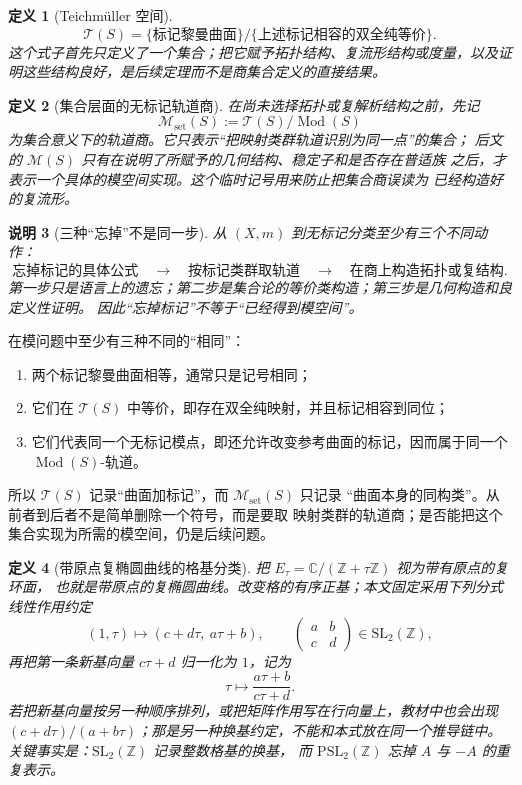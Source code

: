\documentclass[UTF8,fontset=none,a4paper,11pt]{ctexart}
\theoremstyle{foundation-definition}
\newtheorem{definition}{定义}[section]
\theoremstyle{foundation-theorem}
\theoremstyle{foundation-proposition}
\theoremstyle{foundation-example}
\theoremstyle{foundation-remark}
\newtheorem{remark}[definition]{说明}
\theoremstyle{foundation-theorem}
\newcommand{\T}{\mathcal T}
\newcommand{\M}{\mathcal M}
\newcommand{\Mod}{\operatorname{Mod}}
\begin{document}
\begin{definition}[Teichmüller 空间]\label{def:teich}
\[
\T(S)=
\{\text{标记黎曼曲面}\}/
\{\text{上述标记相容的双全纯等价}\}.
\]
这个式子首先只定义了一个集合；把它赋予拓扑结构、复流形结构或度量，以及证明这些结构良好，是后续定理而不是商集合定义的直接结果。
\end{definition}

\begin{definition}[集合层面的无标记轨道商]\label{def:set-moduli}
在尚未选择拓扑或复解析结构之前，先记
\[
\M_{\mathrm{set}}(S):=\T(S)/\Mod(S)
\]
为集合意义下的轨道商。它只表示“把映射类群轨道识别为同一点”的集合；
后文的 \(\M(S)\) 只有在说明了所赋予的几何结构、稳定子和是否存在普适族
之后，才表示一个具体的模空间实现。这个临时记号用来防止把集合商误读为
已经构造好的复流形。
\end{definition}

\begin{remark}[三种“忘掉”不是同一步]\label{rem:three-forgetting-steps}
从 \((X,m)\) 到无标记分类至少有三个不同动作：
\[
\text{忘掉标记的具体公式}
\quad\longrightarrow\quad
\text{按标记类群取轨道}
\quad\longrightarrow\quad
\text{在商上构造拓扑或复结构}.
\]
第一步只是语言上的遗忘；第二步是集合论的等价类构造；第三步是几何构造和良定义性证明。
因此“忘掉标记”不等于“已经得到模空间”。
\end{remark}

在模问题中至少有三种不同的“相同”：
\begin{enumerate}[label=(\arabic*)]
  \item 两个标记黎曼曲面相等，通常只是记号相同；
  \item 它们在 \(\T(S)\) 中等价，即存在双全纯映射，并且标记相容到同位；
  \item 它们代表同一个无标记模点，即还允许改变参考曲面的标记，因而属于同一个 \(\Mod(S)\)-轨道。
\end{enumerate}
所以 \(\T(S)\) 记录“曲面加标记”，而 \(\M_{\mathrm{set}}(S)\) 只记录
“曲面本身的同构类”。从前者到后者不是简单删除一个符号，而是要取
映射类群的轨道商；是否能把这个集合实现为所需的模空间，仍是后续问题。

\begin{definition}[带原点复椭圆曲线的格基分类]\label{def:elliptic-lattice-classification}
把 \(E_\tau=\mathbb C/(\mathbb Z+\tau\mathbb Z)\) 视为带有原点的复环面，
也就是带原点的复椭圆曲线。改变格的有序正基；本文固定采用下列分式线性作用约定
\[
(1,\tau)\longmapsto (c+d\tau,\ a\tau+b),
\qquad
\begin{pmatrix}a&b\\c&d\end{pmatrix}\in\mathrm{SL}_2(\mathbb Z),
\]
再把第一条新基向量 \(c\tau+d\) 归一化为 \(1\)，记为
\[
\tau\longmapsto\frac{a\tau+b}{c\tau+d}.
\]
若把新基向量按另一种顺序排列，或把矩阵作用写在行向量上，教材中也会出现
\((c+d\tau)/(a+b\tau)\)；那是另一种换基约定，不能和本式放在同一个推导链中。
关键事实是：\(\mathrm{SL}_2(\mathbb Z)\) 记录整数格基的换基，
而 \(\mathrm{PSL}_2(\mathbb Z)\) 忘掉 \(A\) 与 \(-A\) 的重复表示。
\end{definition}
\end{document}
